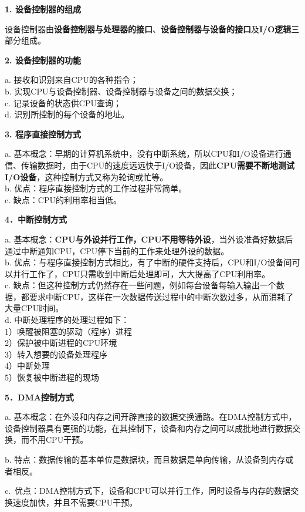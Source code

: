 {\textbf{1. 设备控制器的组成}}

{设备控制器由}\textbf{设备控制器与处理器的接口}{、}\textbf{设备控制器与设备的接口}{及}\textbf{I/O逻辑}{三部分组成。}

{\textbf{2. 设备控制器的功能}}

a. 接收和识别来自CPU的各种指令；\\
b. 实现CPU与设备控制器、设备控制器与设备之间的数据交换；\\
c. 记录设备的状态供CPU查询；\\
d. 识别所控制的每个设备的地址。

{\textbf{3. 程序直接控制方式}}

a.
基本概念：早期的计算机系统中，没有中断系统，所以CPU和I/O设备进行通信、传输数据时，由于CPU的速度远远快于I/O设备，因此\textbf{{CPU需要不断地测试I/O设备}}，这种控制方式又称为轮询或忙等。\\
b. 优点：程序直接控制方式的工作过程非常简单。\\
c. 缺点：CPU的利用率相当低。

\textbf{{4．中断控制方式}}

a.
基本概念：{\textbf{CPU与外设并行工作，CPU不用等待外设}}，当外设准备好数据后通过中断通知CPU，CPU停下当前的工作来处理外设的数据。\\
b.
优点：与程序直接控制方式相比，有了中断的硬件支持后，CPU和I/O设备间可以并行工作了，CPU只需收到中断后处理即可，大大提高了CPU利用率。\\
c.
缺点：但这种控制方式仍然存在一些问题，例如每台设备每输入输出一个数据，都要求中断CPU，这样在一次数据传送过程中的中断次数过多，从而消耗了大量CPU时间。\\
d. 中断处理程序的处理过程如下：\\
1）唤醒被阻塞的驱动（程序）进程\\
2）保护被中断进程的CPU环境\\
3）转入想要的设备处理程序\\
4）中断处理\\
5）恢复被中断进程的现场

\textbf{{5．DMA控制方式}}

{a.
基本概念：}{在外设和内存之间开辟直接的数据交换通路}{。在DMA控制方式中，设备控制器具有更强的功能，在其控制下，设备和内存之间可以成批地进行数据交换，而不用CPU干预。}

b.
特点：数据传输的基本单位是数据块，而且数据是单向传输，从设备到内存或者相反。

c.~优点：{DMA控制方式下，设备和CPU可以并行工作，同时设备与内存的数据交换速度加快，并且不需要CPU干预。}

